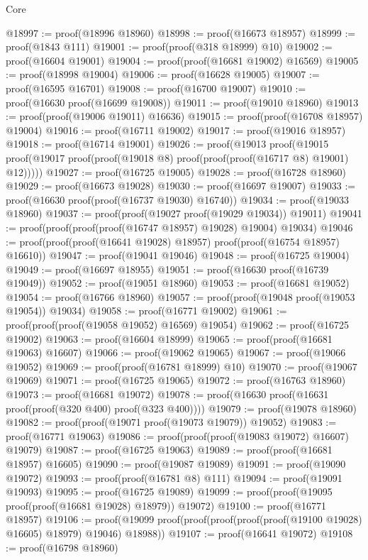 \begin{lexlean}{Core}
\begin{coremodule}
@18997 := proof(@18996 @18960)
@18998 := proof(@16673 @18957)
@18999 := proof(@1843 @111)
@19001 := proof(proof(@318 @18999) @10)
@19002 := proof(@16604 @19001)
@19004 := proof(proof(@16681 @19002) @16569)
@19005 := proof(@18998 @19004)
@19006 := proof(@16628 @19005)
@19007 := proof(@16595 @16701)
@19008 := proof(@16700 @19007)
@19010 := proof(@16630 proof(@16699 @19008))
@19011 := proof(@19010 @18960)
@19013 := proof(proof(@19006 @19011) @16636)
@19015 := proof(proof(@16708 @18957) @19004)
@19016 := proof(@16711 @19002)
@19017 := proof(@19016 @18957)
@19018 := proof(@16714 @19001)
@19026 := proof(@19013
      proof(@19015 proof(@19017 proof(proof(@19018 @8) proof(proof(proof(@16717 @8) @19001) @12)))))
@19027 := proof(@16725 @19005)
@19028 := proof(@16728 @18960)
@19029 := proof(@16673 @19028)
@19030 := proof(@16697 @19007)
@19033 := proof(@16630 proof(proof(@16737 @19030) @16740))
@19034 := proof(@19033 @18960)
@19037 := proof(proof(@19027 proof(@19029 @19034)) @19011)
@19041 := proof(proof(proof(proof(@16747 @18957) @19028) @19004) @19034)
@19046 := proof(proof(proof(@16641 @19028) @18957) proof(proof(@16754 @18957) @16610))
@19047 := proof(@19041 @19046)
@19048 := proof(@16725 @19004)
@19049 := proof(@16697 @18955)
@19051 := proof(@16630 proof(@16739 @19049))
@19052 := proof(@19051 @18960)
@19053 := proof(@16681 @19052)
@19054 := proof(@16766 @18960)
@19057 := proof(proof(@19048 proof(@19053 @19054)) @19034)
@19058 := proof(@16771 @19002)
@19061 := proof(proof(proof(@19058 @19052) @16569) @19054)
@19062 := proof(@16725 @19002)
@19063 := proof(@16604 @18999)
@19065 := proof(proof(@16681 @19063) @16607)
@19066 := proof(@19062 @19065)
@19067 := proof(@19066 @19052)
@19069 := proof(proof(@16781 @18999) @10)
@19070 := proof(@19067 @19069)
@19071 := proof(@16725 @19065)
@19072 := proof(@16763 @18960)
@19073 := proof(@16681 @19072)
@19078 := proof(@16630 proof(@16631 proof(proof(@320 @400) proof(@323 @400))))
@19079 := proof(@19078 @18960)
@19082 := proof(proof(@19071 proof(@19073 @19079)) @19052)
@19083 := proof(@16771 @19063)
@19086 := proof(proof(proof(@19083 @19072) @16607) @19079)
@19087 := proof(@16725 @19063)
@19089 := proof(proof(@16681 @18957) @16605)
@19090 := proof(@19087 @19089)
@19091 := proof(@19090 @19072)
@19093 := proof(proof(@16781 @8) @111)
@19094 := proof(@19091 @19093)
@19095 := proof(@16725 @19089)
@19099 := proof(proof(@19095 proof(proof(@16681 @19028) @18979)) @19072)
@19100 := proof(@16771 @18957)
@19106 := proof(@19099 proof(proof(proof(proof(proof(@19100 @19028) @16605) @18979) @19046) @18988))
@19107 := proof(@16641 @19072)
@19108 := proof(@16798 @18960)

\end{coremodule}
\end{lexlean}
